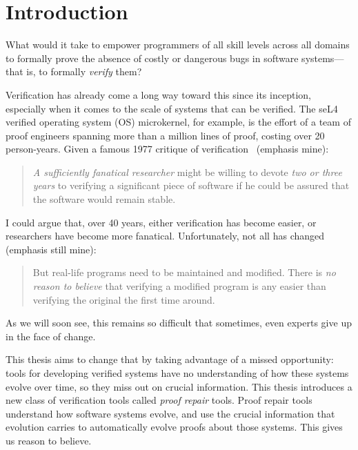 \chapter{Introduction}



What would it take to empower programmers of all skill levels across all domains to formally prove
the absence of costly or dangerous bugs in software systems---that is, to formally \textit{verify} them?

Verification has already come a long way toward this since its inception,
especially when it comes to the scale of systems that can be verified.
The seL4~\cite{Klein2009} verified operating system (OS) microkernel, for example,
is the effort of a team of proof engineers spanning more than
a million lines of proof, costing over 20 person-years.
Given a famous 1977 critique of verification~\cite{DeMillo1977} (emphasis mine):

\begin{quote}
\textit{A sufficiently fanatical researcher}
might be willing to devote \textit{two or 
three years} to verifying a significant 
piece of software if he could be 
assured that the software would remain stable.
\end{quote}
I could argue that, over 40 years, either verification has become easier,
or researchers have become more fanatical. Unfortunately, not all has changed (emphasis still mine):

\begin{quote}
But real-life programs need to 
be maintained and modified. 
There is \textit{no reason to believe} that verifying a modified program is any 
easier than verifying the original the 
first time around.
\end{quote}
As we will soon see, this remains so difficult that sometimes, even experts give up in the face of change. %

This thesis aims to change that by taking advantage of a missed opportunity: tools for developing verified systems
have no understanding of how these systems evolve over time, so they miss out on crucial information.
This thesis introduces a new class of verification tools called \textit{proof repair} tools.
Proof repair tools understand how software systems evolve, and use the crucial information that evolution carries
to automatically evolve proofs about those systems.
This gives us reason to believe.

